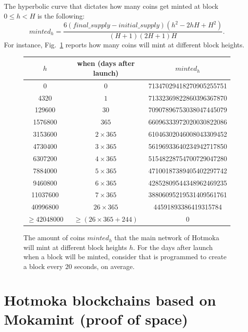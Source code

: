 The hyperbolic curve that dictates how many coins get minted at block $0\le h<H$ is the following:
\[
  \mathit{minted}_h=\frac{6(\mathit{final\_supply}-\mathit{initial\_supply})(h^2-2hH+H^2)}{(H+1)(2H+1)H}.
\]
For instance, Fig.~\ref{fig:maresia_minting} reports how many coins \texttt{\serverMokamintMainChainId{}}
will mint at different block heights.
%
\begin{figure}[th]
\begin{center}
\begin{tabular}{|c|c|c|}
\hline
$h$ & when (days after launch) & $\mathit{minted}_h$ \\\hline\hline
0 & $0$ & 71347029418270905255751\\\hline
4320 & $1$ & 71332369822860396367870\\\hline
129600 & $30$ & 70907896753038047445079\\\hline
1576800 & $365$ & 66096333972020030822086\\\hline
3153600 & $2\times 365$ & 61046302046008043309452 \\\hline
4730400 & $3\times 365$ & 56196933640234942717850 \\\hline
6307200 & $4\times 365$ & 51548228754700729047280 \\\hline
7884000 & $5\times 365$ & 47100187389405402297742 \\\hline
9460800 & $6\times 365$ & 42852809544348962469235 \\\hline
11037600 & $7\times 365$ & 38806095219531409561761 \\\hline
40996800 & $26\times 365$ & 44591893386419315784 \\\hline
$\ge 42048000$ & $\ge(26\times 365 + 244)$ & 0 \\\hline
\end{tabular}
\end{center}
\caption{The amount of coins $\mathit{minted}_h$ that the \texttt{\serverMokamintMainChainId{}}
main network of Hotmoka will mint at different block heights $h$.
For the days after launch when a block will be minted, consider that \texttt{\serverMokamintMainChainId{}} is
programmed to create a block every $20$ seconds, on average.}
\label{fig:maresia_minting}
\end{figure}

\section{Hotmoka blockchains based on Mokamint (proof of space)}\label{sec:hotmoka_mokamint}

